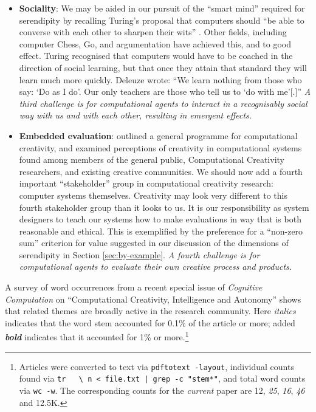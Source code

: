 \begin{itemize}
\item \textbf{Sociality}: We may be aided in our pursuit of the
  ``smart mind'' required for serendipity by recalling Turing's
  proposal that computers should ``be able to converse with each other
  to sharpen their wits'' \cite{turing-intelligent}.  Other fields,
  including computer Chess, Go, and argumentation have achieved this,
  and to good effect.  Turing recognised that computers would have to
  be coached in the direction of social learning, but that once they
  attain that standard they will learn much more quickly.  Deleuze
  \citeyear[p. 26]{deleuze1994difference} wrote: ``We learn nothing
  from those who say: `Do as I do'. Our only teachers are those who
  tell us to `do with me'[.]''  \emph{A third challenge is for
    computational agents to interact in a recognisably social way with
    us and with each other, resulting in emergent effects.}
\end{itemize}

\begin{itemize}
\item \textbf{Embedded evaluation}:
   outlined a general programme
  for computational creativity, and examined perceptions of creativity
  in computational systems found among members of the general public,
  Computational Creativity researchers, and existing creative
  communities.  We should now add a fourth important ``stakeholder''
  group in computational creativity research: computer systems
  themselves.  Creativity may look very different to this fourth
  stakeholder group than it looks to us.  It is our responsibility as
  system designers to teach our systems how to make
  evaluations in way that is both reasonable and ethical.  This is
  exemplified by the preference for a ``non-zero sum'' criterion for
  value suggested in our discussion of the dimensions of serendipity
  in Section \ref{sec:by-example}.  \emph{A fourth challenge is for
    computational agents to evaluate their own creative process and
    products.}
\end{itemize}


A survey of word occurrences from a recent special issue of
\emph{Cognitive Computation} on ``Computational Creativity, Intelligence and Autonomy'' \cite{bishop-erden-special-issue} shows that related themes are broadly
active in the research community.  Here
\emph{italics} indicates that the word stem accounted for 0.1\% of the
article or more; added \textbf{\emph{bold}} indicates that it
accounted for 1\% or more.\footnote{Articles were converted to text
  via {\tt pdftotext -layout}, individual counts found via {\tt tr
    \textquotesingle~\textquotesingle~\textquotesingle\textbackslash
    n\textquotesingle~< file.txt | grep -c "stem*"}, and total word counts
  via {\tt wc -w}.  The corresponding counts for the \emph{current}
  paper are 12, \emph{25}, \emph{16}, \emph{46} and 12.5K.}

